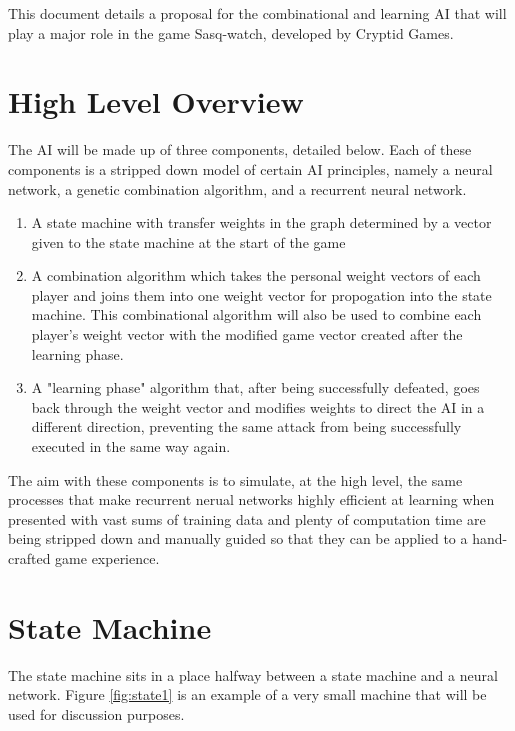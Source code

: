 



\vspace{2em}

This document details a proposal for the combinational and learning AI that will play a major role in the game Sasq-watch, developed by Cryptid Games.

\section{High Level Overview}

The AI will be made up of three components, detailed below. Each of these components is a stripped down model of certain AI principles, namely a neural network, a genetic combination algorithm, and a recurrent neural network.

\begin{enumerate}
    \item A state machine with transfer weights in the graph determined by a vector given to the state machine at the start of the game
    \item A combination algorithm which takes the personal weight vectors of each player and joins them into one weight vector for propogation into the state machine. This combinational algorithm will also be used to combine each player's weight vector with the modified game vector created after the learning phase.
    \item A "learning phase" algorithm that, after being successfully defeated, goes back through the weight vector and modifies weights to direct the AI in a different direction, preventing the same attack from being successfully executed in the same way again.
\end{enumerate}

The aim with these components is to simulate, at the high level, the same processes that make recurrent nerual networks highly efficient at learning when presented with vast sums of training data and plenty of computation time are being stripped down and manually guided so that they can be applied to a hand-crafted game experience.

\section{State Machine}

The state machine sits in a place halfway between a state machine and a neural network. Figure \ref{fig:state1} is an example of a very small machine that will be used for discussion purposes. 

